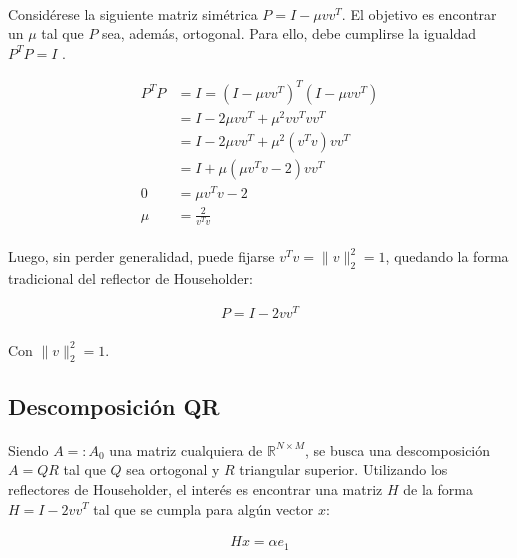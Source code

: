 \documentclass[12pt, twocolumn]{article}
\begin{document}
	\paragraph{} Considérese la siguiente matriz simétrica $P = I - \mu vv^{T}$. El objetivo es encontrar un $\mu$ tal que $P$ sea, además, ortogonal. Para ello, debe cumplirse la igualdad $P^{T}P = I$ \cite{l9}.
	
	
	\begin{align}
		P^{T}P &= I = (I - \mu vv^{T})^{T}(I - \mu vv^{T}) \\
		 &= I - 2\mu vv^{T} + \mu^{2}vv^{T}vv^{T} \\
		 &= I - 2\mu vv^{T} + \mu^{2}(v^{T}v)vv^{T} \\
		 &= I + \mu(\mu v^{T}v - 2)vv^{T} \\
		0 &= \mu v^{T}v - 2 \\
		\mu &= \frac{2}{v^{T}v}
	\end{align}
	
	\paragraph{} Luego, sin perder generalidad, puede fijarse $v^{T}v = \lVert v \rVert _{2}^{2} = 1$, quedando la forma tradicional del reflector de Householder:
	
	\begin{align}
		P = I - 2vv^{T}
	\end{align}
	\paragraph{}Con $\lVert v \rVert _{2}^{2} = 1$.
	
	\subsection{Descomposición QR}
	
	\paragraph{} Siendo $A =: A_{0}$ una matriz cualquiera de $\mathbb{R}^{N\times M}$, se busca una descomposición $A = QR$ tal que $Q$ sea ortogonal y $R$ triangular superior. Utilizando los reflectores de Householder, el interés es encontrar una matriz $H$ de la forma $H = I - 2vv^{T}$ tal que se cumpla para algún vector $x$:
	
	\begin{align}
		Hx = \alpha e_{1}
	\end{align}
\end{document}
